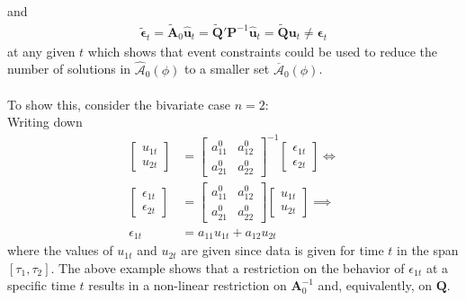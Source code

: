 \documentclass[a4paper,11pt,listof=nochaptergap,oneside,pointednumbers,bibtotoc,bigheadings,liststotoc]{scrbook}
\theoremstyle{mysatz}
\theoremstyle{mydefinition}
\theoremstyle{mybemerkung}
\let\oldhat\hat
\newcommand{\vect}[1]{\boldsymbol{\mathbf{#1}}}
\newcommand{\hatt}[1]{\oldhat{\boldsymbol{\mathbf{#1}}}}
\begin{document}
and 
\begin{equation} \label{eq:svar_ludvi10}
\begin{split}
\widetilde{\vect{\epsilon}}_t = \widetilde{\vect{A}}_0\hatt{\vect{u}}_t = \widetilde{\vect{Q}}'\vect{P}^{-1}\hatt{\vect{u}}_t = \widetilde{\vect{Q}}\vect{u}_t \neq \vect{\epsilon}_t
\end{split}								
\end{equation}
at any given $t$ which shows that event constraints could be used to reduce the number of solutions in $\hatt{\mathcal{A}}_0(\phi)$ to a smaller set $\overline{\vect{\mathcal{A}}}_0(\phi)$. \\
\\
To show this, \citet{ludvigsonetal:18} consider the bivariate case $n=2$:\\
Writing down
\begin{equation} \label{eq:svar_ludvi11}
\begin{split}
	\begin{bmatrix}
    		u_{1t} \\
		u_{2t}
 		\end{bmatrix} & = 
		\begin{bmatrix}
    			a_{11}^0 &  a_{12}^0 \\
			a_{21}^0 &  a_{22}^0
 			\end{bmatrix}^{-1}
			\begin{bmatrix}
    				\epsilon_{1t} \\
				\epsilon_{2t}
 				\end{bmatrix}  \iff \\
	\begin{bmatrix}
    		\epsilon_{1t} \\
		\epsilon_{2t}
 		\end{bmatrix} & = 
		\begin{bmatrix}
    			a_{11}^0 &  a_{12}^0 \\
			a_{21}^0 &  a_{22}^0
 			\end{bmatrix}
			\begin{bmatrix}
    				u_{1t} \\
				u_{2t}
 				\end{bmatrix} \implies \\
				\epsilon_{1t} & = a_{11}u_{1t} + a_{12}u_{2t}
\end{split}								
\end{equation}
where the values of $u_{1t}$ and $u_{2t}$ are given since data is given for time $t$ in the span $[\tau_1, \tau_2]$. The above example shows that a restriction on the behavior of $\epsilon_{1t}$ at a specific time $t$ results in a non-linear restriction on $\vect{A}_0^{-1}$ and, equivalently, on $\vect{Q}$.
\end{document}
